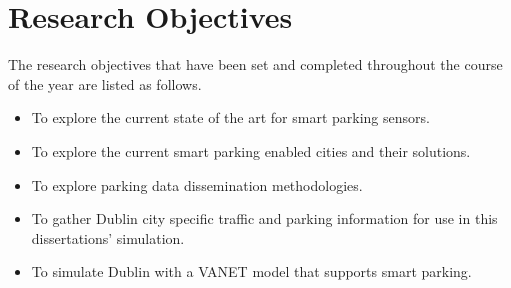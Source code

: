 \section{Research Objectives}
The research objectives that have been set and completed throughout the course of the year are listed as follows. 

\begin{itemize}
    \item To explore the current state of the art for smart parking sensors.
    \item To explore the current smart parking enabled cities and their solutions.
    \item To explore parking data dissemination methodologies.
    \item To gather Dublin city specific traffic and parking information for use in this dissertations' simulation.
    \item To simulate Dublin with a \ac{VANET} model that supports smart parking.
\end{itemize}